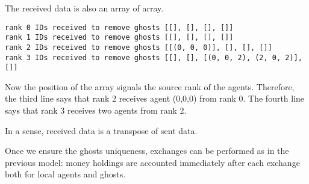 \documentclass{article}
\begin{document}
The received data is also an array of array.
\begin{verbatim}
rank 0 IDs received to remove ghosts [[], [], [], []]
rank 1 IDs received to remove ghosts [[], [], [], []]
rank 2 IDs received to remove ghosts [[(0, 0, 0)], [], [], []]
rank 3 IDs received to remove ghosts [[], [], [(0, 0, 2), (2, 0, 2)], []]
\end{verbatim}
Now the position of the array signals the source rank of the agents. Therefore, the third line says that rank 2 receives agent (0,0,0) from rank 0. The fourth line says that rank 3 receives two agents from rank 2.

In a sense, received data is a transpose of sent data.



Once we ensure the ghosts uniqueness, exchanges can be performed as in the previous model: money holdings are accounted
immediately after each exchange both for local agents and ghosts.
\end{document}
